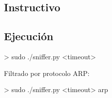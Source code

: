 \subsection{Instructivo}

\subsection{Ejecución}


> sudo ./sniffer.py <timeout> 

Filtrado por protocolo ARP:

> sudo ./sniffer.py <timeout> arp